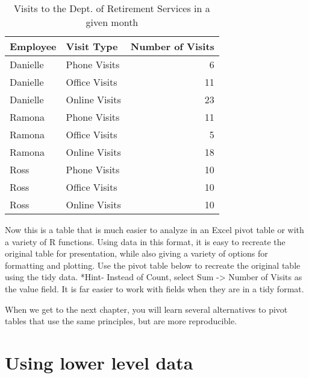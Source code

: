 \documentclass[]{book}
\newenvironment{Shaded}{\begin{snugshade}}{\end{snugshade}}
\newcommand{\KeywordTok}[1]{\textcolor[rgb]{0.13,0.29,0.53}{\textbf{#1}}}
\newcommand{\DataTypeTok}[1]{\textcolor[rgb]{0.13,0.29,0.53}{#1}}
\newcommand{\StringTok}[1]{\textcolor[rgb]{0.31,0.60,0.02}{#1}}
\newcommand{\OperatorTok}[1]{\textcolor[rgb]{0.81,0.36,0.00}{\textbf{#1}}}
\newcommand{\NormalTok}[1]{#1}
\begin{document}
\begin{table}

\caption{\label{tab:unnamed-chunk-3}Visits to the Dept. of Retirement Services in a given month}
\centering
\begin{tabular}[t]{l|l|r}
\hline
Employee & Visit Type & Number of Visits\\
\hline
Danielle & Phone Visits & 6\\
\hline
Danielle & Office Visits & 11\\
\hline
Danielle & Online Visits & 23\\
\hline
Ramona & Phone Visits & 11\\
\hline
Ramona & Office Visits & 5\\
\hline
Ramona & Online Visits & 18\\
\hline
Ross & Phone Visits & 10\\
\hline
Ross & Office Visits & 10\\
\hline
Ross & Online Visits & 10\\
\hline
\end{tabular}
\end{table}

Now this is a table that is much easier to analyze in an Excel pivot
table or with a variety of R functions. Using data in this format, it is
easy to recreate the original table for presentation, while also giving
a variety of options for formatting and plotting. Use the pivot table
below to recreate the original table using the tidy data. *Hint- Instead
of Count, select Sum -\textgreater{} Number of Visits as the value
field. It is far easier to work with fields when they are in a tidy
format.

\begin{Shaded}
\end{Shaded}

\hypertarget{htmlwidget-c09c643864a402aa4f23}{}

When we get to the next chapter, you will learn several alternatives to
pivot tables that use the same principles, but are more reproducible.

\section{Using lower level data}\label{using-lower-level-data}
\end{document}
